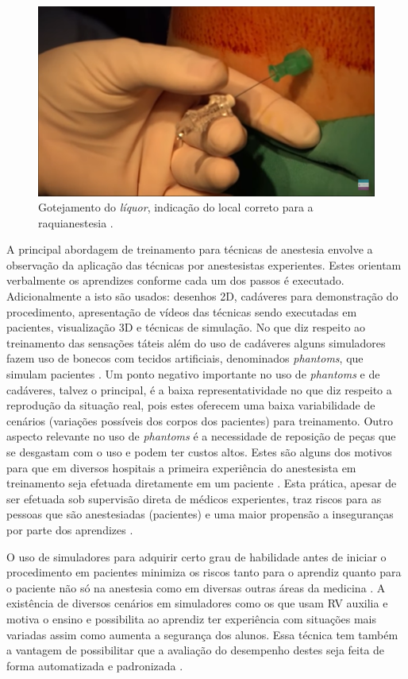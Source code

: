\begin{figure}[!ht]
   \centering
   \includegraphics[width=0.6\linewidth]{capitulos/figuras/3.GotejamentoLiquor.png}
   \caption{Gotejamento do \textit{líquor}, indicação do local correto para a raquianestesia \cite{Londero2018}.}
   \label{fig:gotejamentoLiquor}
\end{figure}

A principal abordagem de treinamento para técnicas de anestesia envolve a observação da aplicação das técnicas por anestesistas experientes. Estes orientam verbalmente os aprendizes conforme cada um dos passos é executado. Adicionalmente a isto são usados: desenhos 2D, cadáveres para demonstração do procedimento, apresentação de vídeos das técnicas sendo executadas em pacientes, visualização 3D \cite{Vrillon2022} e técnicas de simulação. No que diz respeito ao treinamento das sensações táteis além do uso de cadáveres alguns simuladores fazem uso de bonecos com tecidos artificiais, denominados \textit{phantoms}, que simulam pacientes \cite{Dreifaldt2006, KyotoKagaku2015, Mashari2018}. Um ponto negativo importante no uso de \textit{phantoms} e de cadáveres, talvez o principal, é a baixa representatividade no que diz respeito a reprodução da situação real, pois estes oferecem uma baixa variabilidade de cenários (variações possíveis dos corpos dos pacientes) para treinamento.  Outro aspecto relevante no uso de \textit{phantoms} é a necessidade de reposição de peças que se desgastam com o uso e podem ter custos altos. Estes são alguns dos motivos para que em diversos hospitais a primeira experiência do anestesista em treinamento seja efetuada diretamente em um paciente \cite{Aggarwal2009, Grantcharov2008, Smith2005, Watterson2007}. Esta prática, apesar de ser efetuada sob supervisão direta de médicos experientes, traz riscos para as pessoas que são anestesiadas (pacientes) e uma maior propensão a inseguranças por parte dos aprendizes \cite{Elmofty2017}. 

O uso de simuladores para adquirir certo grau de habilidade antes de iniciar o procedimento em pacientes minimiza os riscos tanto para o aprendiz quanto para o paciente não só na anestesia \cite{Escobar-Castillejos2016, Yunoki2018} como em diversas outras áreas da medicina \cite{Akhtar2014, Alvarez-Lopez2020, Hamm2022}. A existência de diversos cenários em simuladores como os que usam \acrfull{RV} auxilia e motiva o ensino e possibilita ao aprendiz ter experiência com situações mais variadas assim como aumenta a segurança dos alunos. Essa técnica tem também a vantagem de possibilitar que a avaliação do desempenho destes seja feita de forma automatizada e padronizada \cite{Willis2014}. 

